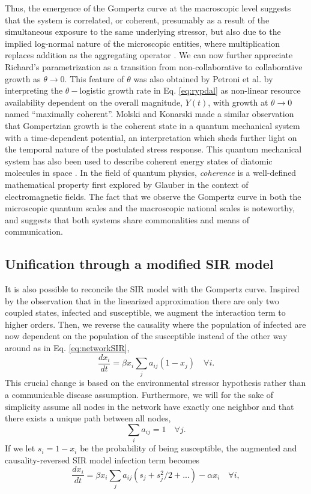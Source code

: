 \documentclass[review]{elsarticle}
\begin{document}
Thus, the emergence of the Gompertz curve at the macroscopic level suggests that the system is correlated, or coherent, presumably as a result of the simultaneous exposure to the same underlying stressor, but also due to the implied log-normal nature of the microscopic entities, where multiplication replaces addition as the aggregating operator \citep{zhang1994log}.
We can now further appreciate Richard's parametrization as a transition from non-collaborative to collaborative growth as $\theta \rightarrow 0$. 
This feature of $\theta$ was also obtained by Petroni et al. \cite{petroni2020logistic} by interpreting the $\theta-$logistic growth rate in Eq. \ref{eq:rypdal} as non-linear resource availability dependent on the overall magnitude, $Y(t)$, with growth at $\theta \rightarrow 0$ named ``maximally coherent''. 
Molski and Konarski \cite{molski2003coherent} made a similar observation that Gompertzian growth is the coherent state in a quantum mechanical system with a time-dependent potential, an interpretation which sheds further light on the temporal nature of the postulated stress response.
This quantum mechanical system has also been used to describe coherent energy states of diatomic molecules in space \citep{morse1929diatomic}. 
In the field of quantum physics, \emph{coherence} is a well-defined mathematical property first explored by Glauber \cite{glauber1963coherent} in the context of electromagnetic fields. The fact that we observe the Gompertz curve in both the microscopic quantum scales and the macroscopic national scales is noteworthy, and suggests that both systems share commonalities and means of communication.

\subsection{Unification through a modified SIR model}
It is also possible to reconcile the SIR model with the Gompertz curve. 
Inspired by the observation that in the linearized approximation there are only two coupled states, infected and susceptible, we augment the interaction term to higher orders. 
Then, we reverse the causality where the population of infected are now dependent on the population of the susceptible instead of the other way around as in Eq. \ref{eq:networkSIR},
\begin{equation}
\label{eq:reverseNetworkSIR}
\frac{d x_i}{dt} = \beta x_i\sum_j{a_{ij}}(1-x_j) \quad \forall i.
\end{equation} 
This crucial change is based on the environmental stressor hypothesis rather than a communicable disease assumption.
Furthermore, we will for the sake of simplicity assume all nodes in the network have exactly one neighbor and that there exists a unique path between all nodes,
\begin{equation}
\sum_i a_{ij} = 1 \quad \forall j.
\end{equation} 
If we let $s_i = 1 - x_i$ be the probability of being susceptible, the augmented and causality-reversed SIR model infection term becomes 
\begin{equation}
\frac{d x_i}{dt} = \beta x_i\sum_j{a_{ij}}(s_{j} + s^2_j/2 + ...) - \alpha x_i\quad \forall i,
\end{equation}
\end{document}

